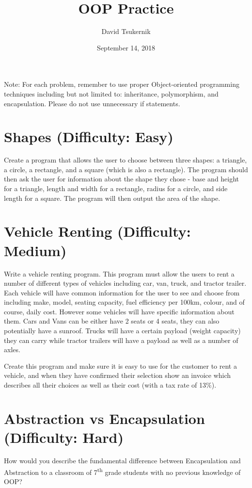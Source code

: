 \documentclass{problem-set}
\title{OOP Practice}
\date{September 14, 2018}
\author{David Tsukernik}
\begin{document}
\maketitle

Note: For each problem, remember to use proper Object-oriented programming techniques including but not limited to: inheritance, polymorphism, and encapsulation. Please do not use unnecessary if statements.

\section{Shapes (Difficulty: Easy)}
Create a program that allows the user to choose between three shapes: a triangle, a circle, a rectangle, and a square (which is also a rectangle). The program should then ask the user for information about the shape they chose - base and height for a triangle, length and width for a rectangle, radius for a circle, and side length for a square. The program will then output the area of the shape.

\section{Vehicle Renting (Difficulty: Medium)}
Write a vehicle renting program. This program must allow the users to rent a number of different types of vehicles including car, van, truck, and tractor trailer. Each vehicle will have common information for the user to see and choose from including make, model, seating capacity, fuel efficiency per 100km, colour, and of course, daily cost. However some vehicles will have specific information about them. Cars and Vans can be either have 2 seats or 4 seats, they can also potentially have a sunroof. Trucks will have a certain payload (weight capacity) they can carry while tractor trailers will have a payload as well as a number of axles.

Create this program and make sure it is easy to use for the customer to rent a vehicle, and when they have confirmed their selection show an invoice which describes all their choices as well as their cost (with a tax rate of 13\%).

\section{Abstraction vs Encapsulation (Difficulty: Hard)}
How would you describe the fundamental difference between Encapsulation and Abstraction to a classroom of 7\textsuperscript{th} grade students with no previous knowledge of OOP?
\end{document}
